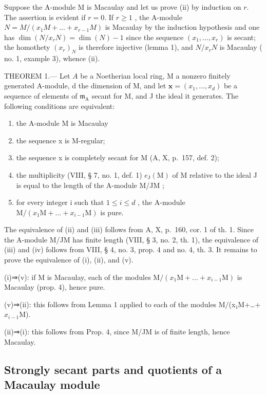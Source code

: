 Suppose the A-module M is Macaulay and let us prove (ii) by induction on \(r\). The assertion is evident if \(r = 0\). If \(r \geqslant 1\) , the A-module \(N = M/(x_1M + \ldots + x_{r-1}M)\) is Macaulay by the induction hypothesis and one has \(\dim(N/x_rN) = \dim(N) - 1\) since the sequence \((x_1, \ldots, x_r)\) is secant; the homothety \((x_r)_N\) is therefore injective (lemma 1), and \(N/x_rN\) is Macaulay (\(\mathrm{no.}\) 1, example 3), whence (ii).

THEOREM 1.--- Let \(A\) be a Noetherian local ring, M a nonzero finitely generated A-module, d the dimension of M, and let \(\mathbf{x} = (x_1, \ldots, x_d)\) be a sequence of elements of \(\mathfrak{m}_{\mathrm{A}}\) secant for M, and J the ideal it generates. The following conditions are equivalent:

\begin{enumerate}
\def\labelenumi{(\roman{enumi})}
\item
  the A-module M is Macaulay
\item
  the sequence x is M-regular;
\item
  the sequence x is completely secant for M (A, X, p.~157, def. 2);
\item
  the multiplicity (VIII, § 7, no. 1, def. 1) \(e_{\mathrm{J}}(\mathrm{M})\) of M relative to the ideal J is equal to the length of the A-module M/JM ;
\item
  for every integer i such that \(1 \leqslant i \leqslant d\) , the A-module \(\mathrm{M}/(x_{1}\mathrm{M}+\ldots+x_{i-1}\mathrm{M})\) is pure.
\end{enumerate}

The equivalence of (ii) and (iii) follows from A, X, p.~160, cor. 1 of th. 1. Since the A-module M/JM has finite length (VIII, § 3, no. 2, th. 1), the equivalence of (iii) and (iv) follows from VIII, § 4, no. 3, prop. 4 and no. 4, th. 3. It remains to prove the equivalence of (i), (ii), and (v).

(i)⇒(v): if M is Macaulay, each of the modules \(\mathrm{M}/(x_{1}\mathrm{M}+\ldots+x_{i-1}\mathrm{M})\) is Macaulay (prop. 4), hence pure.

(v)⇒(ii): this follows from Lemma 1 applied to each of the modules M/(x₁M+\ldots+\(x_{i-1}\){}M).

(ii)⇒(i): this follows from Prop. 4, since M/JM is of finite length, hence Macaulay.

\subsection{Strongly secant parts and quotients of a Macaulay module}

